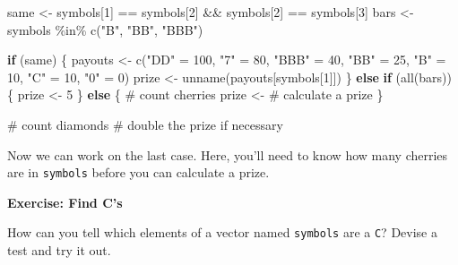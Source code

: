 \documentclass[
  letterpaper,
  DIV=11,
  numbers=noendperiod]{scrbook}
\newenvironment{Shaded}{\begin{snugshade}}{\end{snugshade}}
\newcommand{\CommentTok}[1]{\textcolor[rgb]{0.37,0.37,0.37}{#1}}
\newcommand{\ControlFlowTok}[1]{\textcolor[rgb]{0.00,0.23,0.31}{\textbf{#1}}}
\newcommand{\DecValTok}[1]{\textcolor[rgb]{0.68,0.00,0.00}{#1}}
\newcommand{\FunctionTok}[1]{\textcolor[rgb]{0.28,0.35,0.67}{#1}}
\newcommand{\NormalTok}[1]{\textcolor[rgb]{0.00,0.23,0.31}{#1}}
\newcommand{\OtherTok}[1]{\textcolor[rgb]{0.00,0.23,0.31}{#1}}
\newcommand{\SpecialCharTok}[1]{\textcolor[rgb]{0.37,0.37,0.37}{#1}}
\newcommand{\StringTok}[1]{\textcolor[rgb]{0.13,0.47,0.30}{#1}}
\begin{document}
\begin{Shaded}
\begin{Highlighting}[]
\NormalTok{same }\OtherTok{\textless{}{-}}\NormalTok{ symbols[}\DecValTok{1}\NormalTok{] }\SpecialCharTok{==}\NormalTok{ symbols[}\DecValTok{2}\NormalTok{] }\SpecialCharTok{\&\&}\NormalTok{ symbols[}\DecValTok{2}\NormalTok{] }\SpecialCharTok{==}\NormalTok{ symbols[}\DecValTok{3}\NormalTok{]}
\NormalTok{bars }\OtherTok{\textless{}{-}}\NormalTok{ symbols }\SpecialCharTok{\%in\%} \FunctionTok{c}\NormalTok{(}\StringTok{"B"}\NormalTok{, }\StringTok{"BB"}\NormalTok{, }\StringTok{"BBB"}\NormalTok{)}

\ControlFlowTok{if}\NormalTok{ (same) \{}
\NormalTok{  payouts }\OtherTok{\textless{}{-}} \FunctionTok{c}\NormalTok{(}\StringTok{"DD"} \OtherTok{=} \DecValTok{100}\NormalTok{, }\StringTok{"7"} \OtherTok{=} \DecValTok{80}\NormalTok{, }\StringTok{"BBB"} \OtherTok{=} \DecValTok{40}\NormalTok{, }\StringTok{"BB"} \OtherTok{=} \DecValTok{25}\NormalTok{, }
    \StringTok{"B"} \OtherTok{=} \DecValTok{10}\NormalTok{, }\StringTok{"C"} \OtherTok{=} \DecValTok{10}\NormalTok{, }\StringTok{"0"} \OtherTok{=} \DecValTok{0}\NormalTok{)}
\NormalTok{  prize }\OtherTok{\textless{}{-}} \FunctionTok{unname}\NormalTok{(payouts[symbols[}\DecValTok{1}\NormalTok{]])}
\NormalTok{\} }\ControlFlowTok{else} \ControlFlowTok{if}\NormalTok{ (}\FunctionTok{all}\NormalTok{(bars)) \{}
\NormalTok{  prize }\OtherTok{\textless{}{-}} \DecValTok{5}
\NormalTok{\} }\ControlFlowTok{else}\NormalTok{ \{}
  \CommentTok{\# count cherries}
\NormalTok{  prize }\OtherTok{\textless{}{-}} \CommentTok{\# calculate a prize}
\NormalTok{\}}

\CommentTok{\# count diamonds}
\CommentTok{\# double the prize if necessary}
\end{Highlighting}
\end{Shaded}

Now we can work on the last case. Here, you'll need to know how many
cherries are in \texttt{symbols} before you can calculate a prize.

\begin{tcolorbox}[enhanced jigsaw, left=2mm, breakable, colback=white, colframe=quarto-callout-color-frame, leftrule=.75mm, bottomrule=.15mm, arc=.35mm, opacityback=0, rightrule=.15mm, toprule=.15mm]

\vspace{-3mm}\textbf{Exercise: Find C's}\vspace{3mm}

How can you tell which elements of a vector named \texttt{symbols} are a
\texttt{C}? Devise a test and try it out.

\end{tcolorbox}
\end{document}
